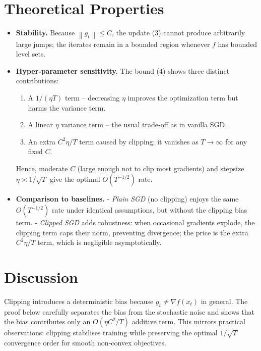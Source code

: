 \documentclass{article}
\newcommand{\norm}[1]{\left\lVert #1\right\rVert}
\begin{document}
\section*{Theoretical Properties}
\begin{itemize}
\item \textbf{Stability.} Because $\norm{g_t}\le C$, the update (3) cannot produce arbitrarily large jumps; the iterates remain in a bounded region whenever $f$ has bounded level sets.
\item \textbf{Hyper‑parameter sensitivity.} The bound (4) shows three distinct contributions:
    \begin{enumerate}
        \item A $1/(\eta T)$ term – decreasing $\eta$ improves the optimization term but harms the variance term.
        \item A linear $\eta$ variance term – the usual trade‑off as in vanilla SGD.
        \item An extra $C^{2}\eta/T$ term caused by clipping; it vanishes as $T\to\infty$ for any fixed $C$.
    \end{enumerate}
    Hence, moderate $C$ (large enough not to clip most gradients) and stepsize $\eta\asymp 1/\sqrt{T}$ give the optimal $O(T^{-1/2})$ rate.
\item \textbf{Comparison to baselines.}  
    - \emph{Plain SGD} (no clipping) enjoys the same $O(T^{-1/2})$ rate under identical assumptions, but without the clipping bias term.  
    - \emph{Clipped SGD} adds robustness: when occasional gradients explode, the clipping term caps their norm, preventing divergence; the price is the extra $C^{2}\eta/T$ term, which is negligible asymptotically.
\end{itemize}

\section*{Discussion}
Clipping introduces a deterministic bias because $g_t\neq\nabla f(x_t)$ in general. The proof below carefully separates the bias from the stochastic noise and shows that the bias contributes only an $O(\eta C^{2}/T)$ additive term. This mirrors practical observations: clipping stabilises training while preserving the optimal $1/\sqrt{T}$ convergence order for smooth non‑convex objectives.
\end{document}
